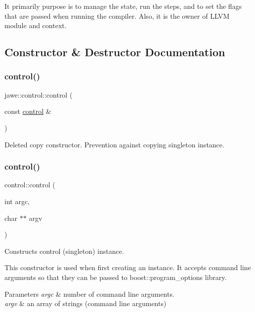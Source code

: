 It\textquotesingle{} primarily purpose is to manage the state, run the steps, and to set the flags that are passed when running the compiler. Also, it is the owner of L\+L\+VM module and context. 

\subsection{Constructor \& Destructor Documentation}
\mbox{\label{classjawe_1_1control_a389d474b7c44f71337414bc0654be440}} 
\subsubsection{\texorpdfstring{control()}{control()}\hspace{0.1cm}{\footnotesize\ttfamily [1/2]}}
{\footnotesize\ttfamily jawe\+::control\+::control (\begin{DoxyParamCaption}\item[{const \hyperlink{classjawe_1_1control}{control} \&}]{ }\end{DoxyParamCaption})\hspace{0.3cm}{\ttfamily [delete]}}

Deleted copy constructor. Prevention against copying singleton instance. \mbox{\label{classjawe_1_1control_abaa77c23608e1eec0077bc9e4ae1554c}} 
\subsubsection{\texorpdfstring{control()}{control()}\hspace{0.1cm}{\footnotesize\ttfamily [2/2]}}
{\footnotesize\ttfamily control\+::control (\begin{DoxyParamCaption}\item[{int}]{argc,  }\item[{char $\ast$$\ast$}]{argv }\end{DoxyParamCaption})\hspace{0.3cm}{\ttfamily [private]}}



Constructs control (singleton) instance. 

This constructor is used when first creating an instance. It accepts command line arguments so that they can be passed to boost\+::program\+\_\+options library. 
\begin{DoxyParams}{Parameters}
{\em argc} & number of command line arguments. \\
\hline
{\em argv} & an array of strings (command line arguments) \\
\hline
\end{DoxyParams}


